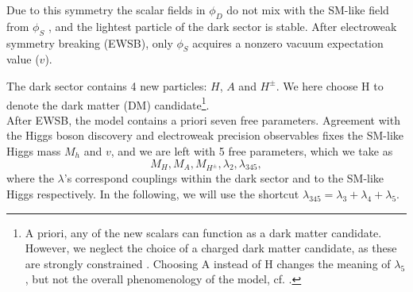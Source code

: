\documentclass{PoS}
\newcommand{\eqn}{equation}
\newcommand{\lam}{\lambda}
\begin{document}
Due to this symmetry the  scalar field{s}  {in $\phi_D$} do not mix with the SM-like field {from} $\phi_S$ , and {the} lightest particle of  {the} dark sector is stable.  
{{After {electroweak symmetry breaking} (EWSB), only $\phi_S$ acquires  {a} nonzero vacuum expectation value ($v$).}}
{The dark sector  {contains} 4 new particles: $H$, $A$ and $H^{\pm}$.  {We here choose H to denote the} dark matter (DM) candidate\footnote{ {A priori, any of the new scalars can function as a dark matter candidate. However, we neglect the choice of a charged dark matter candidate, as these are strongly constrained \cite{Chuzhoy:2008zy}. Choosing A instead of H changes the meaning of $\lam_5$, but not the overall phenomenology of the model, cf. \cite{Ilnicka:2015jba}.}}.  \\

 {After EWSB, the model contains a priori seven free parameters. Agreement with the Higgs boson discovery and electroweak precision observables fixes} the SM-like Higgs mass  {$M_h$} and $v$,  {and we are left with} 5 free parameters, which we take {as}
\begin{\eqn}\label{eq:physbas}
M_H, M_A, M_{H^{\pm}}, \lam_2, \lam_{345},
\end{\eqn}
 where  {the} $\lambda$'s correspond coupling{s}  {within the dark sector} and {to the} SM-like Higgs respectively. {In the following, we will use the shortcut}  $\lam_{345} = \lam_{3}+\lam_{4}+\lam_{5}$. 



}
\end{document}

